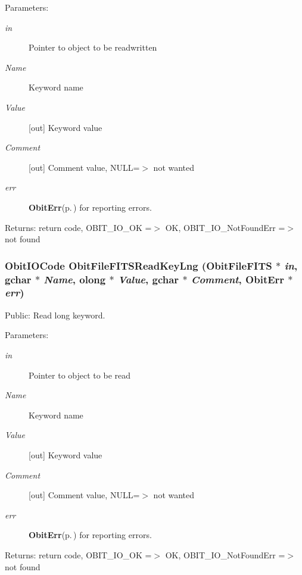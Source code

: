\begin{Desc}
\item[Parameters:]
\begin{description}
\item[{\em in}]Pointer to object to be readwritten \item[{\em Name}]Keyword name \item[{\em Value}][out] Keyword value \item[{\em Comment}][out] Comment value, NULL=$>$ not wanted \item[{\em err}]{\bf Obit\-Err}{\rm (p.\,\pageref{structObitErr})} for reporting errors. \end{description}
\end{Desc}
\begin{Desc}
\item[Returns:]return code, OBIT\_\-IO\_\-OK =$>$ OK, OBIT\_\-IO\_\-Not\-Found\-Err =$>$ not found \end{Desc}
\subsubsection{\setlength{\rightskip}{0pt plus 5cm}Obit\-IOCode Obit\-File\-FITSRead\-Key\-Lng ({\bf Obit\-File\-FITS} $\ast$ {\em in}, gchar $\ast$ {\em Name}, {\bf olong} $\ast$ {\em Value}, gchar $\ast$ {\em Comment}, {\bf Obit\-Err} $\ast$ {\em err})}\label{ObitFileFITS_8c_a20}


Public: Read long keyword. 

\begin{Desc}
\item[Parameters:]
\begin{description}
\item[{\em in}]Pointer to object to be read \item[{\em Name}]Keyword name \item[{\em Value}][out] Keyword value \item[{\em Comment}][out] Comment value, NULL=$>$ not wanted \item[{\em err}]{\bf Obit\-Err}{\rm (p.\,\pageref{structObitErr})} for reporting errors. \end{description}
\end{Desc}
\begin{Desc}
\item[Returns:]return code, OBIT\_\-IO\_\-OK =$>$ OK, OBIT\_\-IO\_\-Not\-Found\-Err =$>$ not found \end{Desc}
